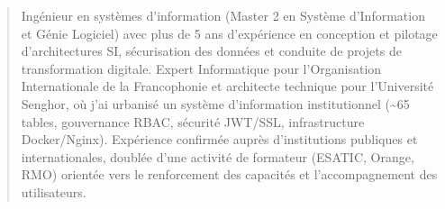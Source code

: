 \documentclass[10pt,a4paper,ragged2e,withhyper]{altacv}
\begin{document}


    \makecvheader

    \begin{quote}
    \normalsize Ingénieur en systèmes d'information (Master 2 en Système d'Information et Génie Logiciel) avec plus de 5 ans d'expérience en conception et pilotage d'architectures SI, sécurisation des données et conduite de projets de transformation digitale. Expert Informatique pour l'Organisation Internationale de la Francophonie et architecte technique pour l'Université Senghor, où j'ai urbanisé un système d'information institutionnel (\textasciitilde65 tables, gouvernance RBAC, sécurité JWT/SSL, infrastructure Docker/Nginx). Expérience confirmée auprès d'institutions publiques et internationales, doublée d'une activité de formateur (ESATIC, Orange, RMO) orientée vers le renforcement des capacités et l'accompagnement des utilisateurs.
    \end{quote}
    \vspace{-0.5em}
\end{document}

